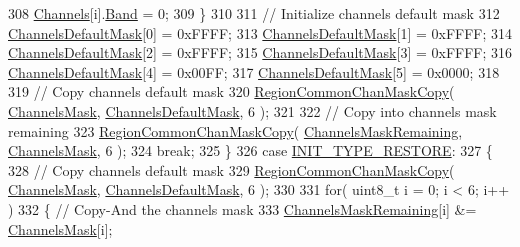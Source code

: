 \begin{DoxyCode}
308                 \mbox{\hyperlink{_region_a_u915_8c_aef41de8bb5a74331478b9f755e713542}{Channels}}[i].\mbox{\hyperlink{structs_channel_params_a724c03aa06953111c3291243831f251b}{Band}} = 0;
309             \}
310 
311             \textcolor{comment}{// Initialize channels default mask}
312             \mbox{\hyperlink{_region_a_u915_8c_ac127b19779301713d5ed92eb03366a2d}{ChannelsDefaultMask}}[0] = 0xFFFF;
313             \mbox{\hyperlink{_region_a_u915_8c_ac127b19779301713d5ed92eb03366a2d}{ChannelsDefaultMask}}[1] = 0xFFFF;
314             \mbox{\hyperlink{_region_a_u915_8c_ac127b19779301713d5ed92eb03366a2d}{ChannelsDefaultMask}}[2] = 0xFFFF;
315             \mbox{\hyperlink{_region_a_u915_8c_ac127b19779301713d5ed92eb03366a2d}{ChannelsDefaultMask}}[3] = 0xFFFF;
316             \mbox{\hyperlink{_region_a_u915_8c_ac127b19779301713d5ed92eb03366a2d}{ChannelsDefaultMask}}[4] = 0x00FF;
317             \mbox{\hyperlink{_region_a_u915_8c_ac127b19779301713d5ed92eb03366a2d}{ChannelsDefaultMask}}[5] = 0x0000;
318 
319             \textcolor{comment}{// Copy channels default mask}
320             \mbox{\hyperlink{group___r_e_g_i_o_n_c_o_m_m_o_n_ga95f5199d490113269fae7f2e0569e9a0}{RegionCommonChanMaskCopy}}( \mbox{\hyperlink{_region_a_u915_8c_a2188957b5ca6af8092154d7ccbfa5757}{ChannelsMask}}, 
      \mbox{\hyperlink{_region_a_u915_8c_ac127b19779301713d5ed92eb03366a2d}{ChannelsDefaultMask}}, 6 );
321 
322             \textcolor{comment}{// Copy into channels mask remaining}
323             \mbox{\hyperlink{group___r_e_g_i_o_n_c_o_m_m_o_n_ga95f5199d490113269fae7f2e0569e9a0}{RegionCommonChanMaskCopy}}( 
      \mbox{\hyperlink{_region_a_u915_8c_a567333cec639a004655cc1717e9d0928}{ChannelsMaskRemaining}}, \mbox{\hyperlink{_region_a_u915_8c_a2188957b5ca6af8092154d7ccbfa5757}{ChannelsMask}}, 6 );
324             \textcolor{keywordflow}{break};
325         \}
326         \textcolor{keywordflow}{case} \mbox{\hyperlink{group___r_e_g_i_o_n_gga11ecad794560a3d3961bdf1c9a27d3b2aed3218cb3c4ebbb74a1b48e4f8ac8599}{INIT\_TYPE\_RESTORE}}:
327         \{
328             \textcolor{comment}{// Copy channels default mask}
329             \mbox{\hyperlink{group___r_e_g_i_o_n_c_o_m_m_o_n_ga95f5199d490113269fae7f2e0569e9a0}{RegionCommonChanMaskCopy}}( \mbox{\hyperlink{_region_a_u915_8c_a2188957b5ca6af8092154d7ccbfa5757}{ChannelsMask}}, 
      \mbox{\hyperlink{_region_a_u915_8c_ac127b19779301713d5ed92eb03366a2d}{ChannelsDefaultMask}}, 6 );
330 
331             \textcolor{keywordflow}{for}( uint8\_t i = 0; i < 6; i++ )
332             \{ \textcolor{comment}{// Copy-And the channels mask}
333                 \mbox{\hyperlink{_region_a_u915_8c_a567333cec639a004655cc1717e9d0928}{ChannelsMaskRemaining}}[i] &= \mbox{\hyperlink{_region_a_u915_8c_a2188957b5ca6af8092154d7ccbfa5757}{ChannelsMask}}[i];

\end{DoxyCode}
